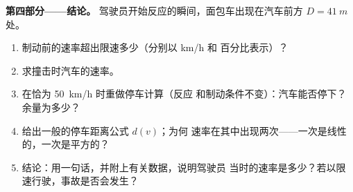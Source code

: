 \begin{problem}
\medskip
\noindent\textbf{第四部分——结论。}
驾驶员开始反应的瞬间，面包车出现在汽车前方
$D = \qty{41}{m}$ 处。
\begin{enumerate}[resume]
  \item 制动前的速率超出限速多少（分别以 \unit{km/h} 和
        百分比表示）？
  \item 求撞击时汽车的速率。
  \item 在恰为 \qty{50}{km/h} 时重做停车计算（反应
        和制动条件不变）：汽车能否停下？余量为多少？
  \item 给出一般的停车距离公式 $d(v)$；为何
        速率在其中出现两次——一次是线性的，一次是平方的？
  \item 结论：用一句话，并附上有关数据，说明驾驶员
        当时的速率是多少？若以限速行驶，事故是否会发生？
\end{enumerate}
\end{problem}
